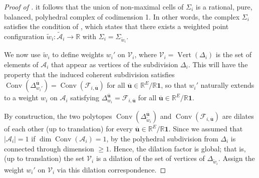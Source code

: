 \documentclass[11pt]{amsart}
\newcommand{\RR}{\mathbb R}
\newcommand{\bu}{{\mathbf u}}
\theoremstyle{definition}
\newcommand{\leon}[1]{{\color{teal} \sf Leon: [#1]}}
\newcommand{\chris}[1]{{\color{cyan} \sf Chris: [#1]}}
\begin{document}
\begin{proof}[Proof of ]
it follows that the union of non-maximal cells of $\Sigma_i$ is a rational, pure, balanced, polyhedral complex of codimension 1.  In other words, the complex $\Sigma_i$ satisfies the condition of \cite[Proposition 3.3.10]{MS15}, which states that there exists a weighted point configuration $\widetilde w_i: \widetilde{\mathcal A}_i \to \RR$ with $\Sigma_i = \Sigma_{\widetilde w_i}$.  

We now use $\widetilde w_i$ to define weights $w_i'$ on $\mathscr V_i$, where $\mathscr V_i = \operatorname{Vert}(\Delta_i)$ is the set of elements of $\mathcal A_i$ that appear as vertices of the subdivision $\Delta_i$.  This will have the property that the induced coherent subdivision satisfies $\operatorname{Conv}(\Delta_{w_i'}^{\overline \bu}) = \operatorname{Conv}(\mathcal F_{i,\overline\bu})$ for all $\overline\bu\in \RR^E/\RR\mathbf 1$, so that $w_i'$ naturally extends to a weight $w_i$ on $\mathcal A_i$ satisfying $\Delta_{w_i}^{\overline\bu} = \mathcal F_{i,\overline\bu}$ for all $\overline\bu\in \RR^E/\RR\mathbf 1$.  

By construction, the two polytopes $\operatorname{Conv}(\Delta_{\widetilde w_i}^{\overline\bu})$ and $\operatorname{Conv}(\mathcal F_{i,\overline\bu})$ are dilates of each other (up to translation) for every $\overline\bu\in \RR^E/\RR\mathbf 1$.  Since we assumed that $|\mathcal A_i| = 1$ if $\dim \operatorname{Conv}(\mathcal A_i) = 1$, by  the polyhedral subdivision from $\Delta_i$ is connected through dimension $\geq 1$.  Hence, the dilation factor is global; that is, (up to translation) the set $\mathscr V_i$ is a dilation of the set of vertices of $\Delta_{\widetilde w_i}$.  Assign the weight $w_i'$ on $\mathscr V_i$ via this dilation correspondence.
\end{proof}
\end{document}
